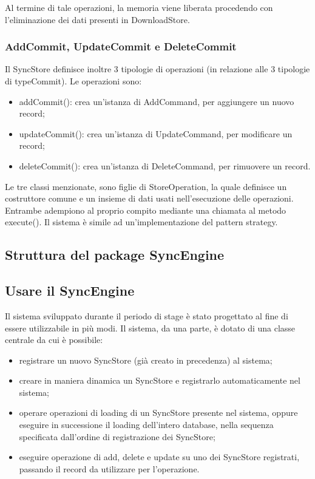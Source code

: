 \documentclass[10pt,a4paper,onecolumn]{article}
\begin{document}
Al termine di tale operazioni, la memoria viene liberata procedendo con l'eliminazione dei dati presenti in DownloadStore. 

\subsubsection{AddCommit, UpdateCommit e DeleteCommit}

Il SyncStore definisce inoltre 3 tipologie di operazioni (in relazione alle 3 tipologie di typeCommit). Le operazioni sono:
\begin{itemize}
	\item addCommit(): crea un'istanza di AddCommand, per aggiungere un nuovo record;
	\item updateCommit(): crea un'istanza di UpdateCommand, per modificare un record;
	\item deleteCommit(): crea un'istanza di DeleteCommand, per rimuovere un record.
\end{itemize}

Le tre classi menzionate, sono figlie di StoreOperation, la quale definisce un costruttore comune e un insieme di dati usati nell'esecuzione delle operazioni. Entrambe adempiono al proprio compito mediante una chiamata al metodo execute(). Il sistema è simile ad un'implementazione del pattern strategy.

\subsection{Struttura del package SyncEngine}

\subsection{Usare il SyncEngine}

Il sistema sviluppato durante il periodo di stage è stato progettato al fine di essere utilizzabile in più modi. Il sistema, da una parte, è dotato di una classe centrale da cui è possibile:
\begin{itemize}
	\item registrare un nuovo SyncStore (già creato in precedenza) al sistema;
	\item creare in maniera dinamica un SyncStore e registrarlo automaticamente nel sistema;
	\item operare operazioni di loading di un SyncStore presente nel sistema, oppure eseguire in successione il loading dell'intero database, nella sequenza specificata dall'ordine di registrazione dei SyncStore;
	\item eseguire operazione di add, delete e update su uno dei SyncStore registrati, passando il record da utilizzare per l'operazione.
\end{itemize}
\end{document}
